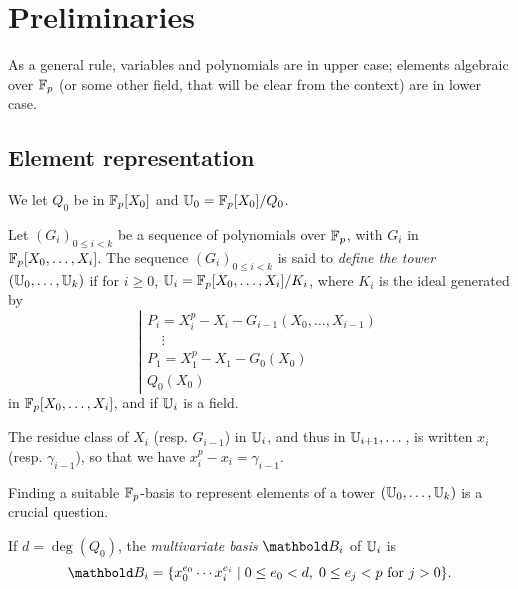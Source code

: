 

\section{Preliminaries}
\label{sec:arithmetics}

As a general rule, variables and polynomials are in upper
case; elements algebraic over $\mathbb{F}_p$ (or some other field, that will
be clear from the context) are in lower case.
 

\subsection{Element representation}\label{ssec:rep}

We let $Q_0$ be in $\mathbb{F}_p[X_0]$ and $\mathbb{U}_0=\mathbb{F}_p[X_0]/Q_0$.

\begin{definition}
  \label{def:primitive-tower}
  Let $(G_i)_{0 \le i < k}$ be a sequence of polynomials over $\mathbb{F}_p$,
  with $G_i$ in $\mathbb{F}_p[X_0,\dots,X_i]$.  The sequence $(G_i)_{0\le i
    <k}$ is said to {\em define the tower} $(\mathbb{U}_0,\dots,\mathbb{U}_k)$ if for
  $i \ge 0$, $\mathbb{U}_i=\mathbb{F}_p[X_0,\dots,X_i]/K_i$, where $K_i$ is the ideal
  generated by
  \begin{equation}
    \label{eq:57}
    \left | \begin{array}{l}
        P_i=X_i^p-X_i -G_{i-1}(X_0,\dots,X_{i-1})\\
        ~~~\,~\vdots\\
        P_1=X_1^p-X_1-G_0(X_0)\\
        Q_0(X_0)
      \end{array}\right .
  \end{equation}
  in $\mathbb{F}_p[X_0,\dots,X_i]$, and if $\mathbb{U}_i$ is a field. 

  The residue class of $X_i$ (resp. $G_{i-1}$) in $\mathbb{U}_i$, and thus in
  $\mathbb{U}_{i+1},\dots$, is written $x_i$ (resp. $\gamma_{i-1}$), so that
  we have $x_i^p-x_i=\gamma_{i-1}$.
\end{definition}

Finding a suitable $\mathbb{F}_p$-basis to represent elements of a tower
$(\mathbb{U}_0,\dots,\mathbb{U}_k)$ is a crucial question. 

\begin{definition}
  If $d=\deg(Q_0)$, the \emph{multivariate basis} $\basis{B}_i$ of
  $\mathbb{U}_i$ is
  \begin{equation}
  \basis{B}_i=
  \{x_0^{e_0} \cdots x_i^{e_i} \;|\; 0 \le e_0 < d,\; 0\le e_j < p 
  \text{ for $j>0$}\}
  \text{.}
\end{equation}
\end{definition}

